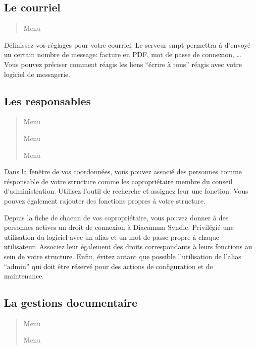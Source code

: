 \documentclass[a4paper,10pt,oneside,french]{sphinxmanual}
\begin{document}
\subsection{Le courriel}
\label{\detokenize{syndic/first_step:le-courriel}}\begin{quote}

Menu 
\end{quote}

Définissez vos réglages pour votre courriel.
Le serveur smpt permettra à  d’envoyé un certain nombre de message: facture en PDF, mot de passe de connexion, …
Vous pouvez préciser comment réagis les liens “écrire à tous” réagis avec votre logiciel de messagerie.


\subsection{Les responsables}
\label{\detokenize{syndic/first_step:les-responsables}}\begin{quote}

Menu 

Menu 

Menu 
\end{quote}

Dans la fenêtre de vos coordonnées, vous pouvez associé des personnes comme résponsable de votre structure comme les copropriétaire membre du conseil d’administration.
Utilisez l’outil de recherche et assignez leur une fonction.
Vous pouvez également rajouter des fonctions propres à votre structure.

Depuis la fiche de chacun de vos copropriétaire, vous pouvez donner à des personnes actives un droit de connexion à Diacamma Syndic.
Privilégié une utilisation du logiciel avec un alias et un mot de passe propre à chaque utilisateur. Associez leur également des droits correspondants à leurs fonctions au sein de votre structure.
Enfin, évitez autant que possible l’utilisation de l’alias “admin” qui doit être réservé pour des actions de configuration et de maintenance.


\subsection{La gestions documentaire}
\label{\detokenize{syndic/first_step:la-gestions-documentaire}}\begin{quote}

Menu 

Menu 
\end{quote}
\end{document}
